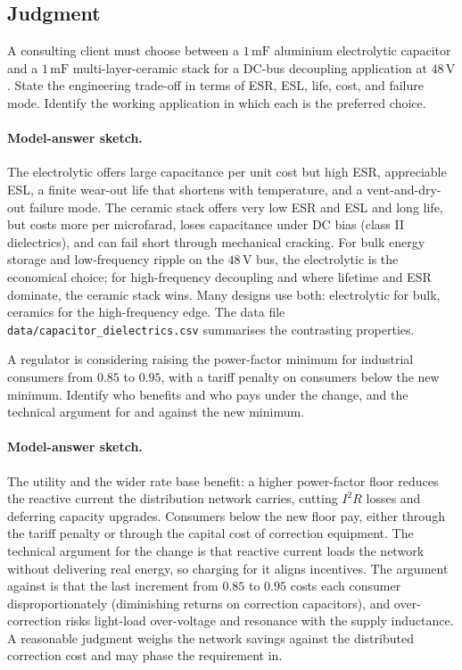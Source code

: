 \subsection*{Judgment}

\begin{exercise}
A consulting client must choose between a $1\,\si{\milli\farad}$
aluminium electrolytic capacitor and a $1\,\si{\milli\farad}$
multi-layer-ceramic stack for a DC-bus decoupling application at
$48\,\si{\volt}$. State the engineering trade-off in terms of ESR,
ESL, life, cost, and failure mode. Identify the working application
in which each is the preferred choice.
\paragraph{Model-answer sketch.}
The electrolytic offers large capacitance per unit cost but high ESR,
appreciable ESL, a finite wear-out life that shortens with temperature,
and a vent-and-dry-out failure mode. The ceramic stack offers very low
ESR and ESL and long life, but costs more per microfarad, loses
capacitance under DC bias (class II dielectrics), and can fail short
through mechanical cracking. For bulk energy storage and low-frequency
ripple on the $48\,\si{\volt}$ bus, the electrolytic is the economical
choice; for high-frequency decoupling and where lifetime and ESR
dominate, the ceramic stack wins. Many designs use both: electrolytic
for bulk, ceramics for the high-frequency edge. The data file
\texttt{data/capacitor\_dielectrics.csv} summarises the contrasting
properties.
\end{exercise}

\begin{exercise}
A regulator is considering raising the power-factor minimum for
industrial consumers from $0.85$ to $0.95$, with a tariff penalty on
consumers below the new minimum. Identify who benefits and who pays
under the change, and the technical argument for and against the new
minimum.
\paragraph{Model-answer sketch.}
The utility and the wider rate base benefit: a higher power-factor floor
reduces the reactive current the distribution network carries, cutting
$I^{2}R$ losses and deferring capacity upgrades. Consumers below the new
floor pay, either through the tariff penalty or through the capital cost
of correction equipment. The technical argument for the change is that
reactive current loads the network without delivering real energy, so
charging for it aligns incentives. The argument against is that the last
increment from $0.85$ to $0.95$ costs each consumer disproportionately
(diminishing returns on correction capacitors), and over-correction
risks light-load over-voltage and resonance with the supply
inductance. A reasonable judgment weighs the network savings against the
distributed correction cost and may phase the requirement in.
\end{exercise}

